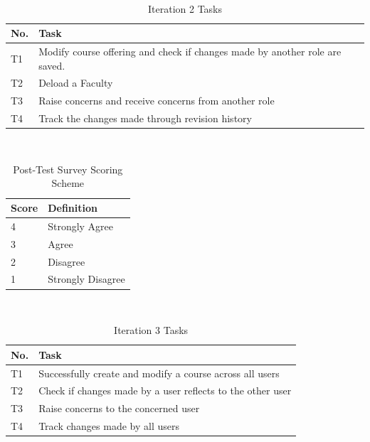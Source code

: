 \begin{table}
  \centering
  \caption{Iteration 2 Tasks}~\label{tab:tasks2}
  \addtolength{\tabcolsep}{2pt} 
  \begin{tabular}{p{0.5cm}|p{6.5cm}}
  	\toprule
    \rule{0pt}{8pt}No. & Task \\[2pt]
    \toprule
    T1 & Modify course offering and check if changes made by another role are saved. \\
    T2 & Deload a Faculty \\
    T3 & Raise concerns and receive concerns from another role \\
    T4 & Track the changes made through revision history \\
    \bottomrule
  \end{tabular}
  \addtolength{\tabcolsep}{-2pt} 
\end{table}
\begin{table}
  \centering
  \caption{Post-Test Survey Scoring Scheme}~\label{tab:scoring_scheme}
  \addtolength{\tabcolsep}{2pt} 
  \begin{tabular}{p{1cm}|p{5cm}}
  	\toprule
    \rule{0pt}{8pt}Score & Definition\\[2pt]
    \toprule
    4 & Strongly Agree \\
    3 & Agree \\
    2 & Disagree \\
    1 & Strongly Disagree \\
    \bottomrule
  \end{tabular}
  \addtolength{\tabcolsep}{-2pt} 
\end{table}
\begin{table}
  \centering
  \caption{Iteration 3 Tasks}~\label{tab:tasks3}
  \addtolength{\tabcolsep}{2pt} 
  \begin{tabular}{p{0.5cm}|p{6.5cm}}
  	\toprule
    \rule{0pt}{8pt}No. & Task \\[2pt]
    \toprule
    T1 & Successfully create and modify a course across all users \\
    T2 & Check if changes made by a user reflects to the other user \\
    T3 & Raise concerns to the concerned user \\
    T4 & Track changes made by all users \\
    \bottomrule
  \end{tabular}
  \addtolength{\tabcolsep}{-2pt} 
\end{table}
